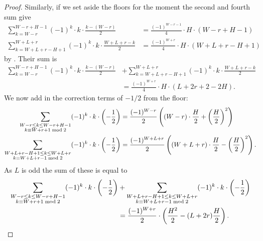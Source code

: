\begin{proof}
  Similarly, if we set aside the floors for the moment the second and fourth sum give
  \begin{align*}
    \sum_{k=W-r}^{W-r + H - 1} (-1)^{k} \cdot k \cdot \frac{k-(W-r)}{2}
    &= \frac{(-1)^{W-r-1}}{4} \cdot H \cdot \left( W - r + H - 1 \right) \\
    \sum_{k=W+L+r - H + 1}^{W+L+r} (-1)^{k} \cdot k \cdot \frac{W+L+r-k}{2}
    &= \frac{(-1)^{W+r}}{4} \cdot H \cdot \left( W + L + r - H + 1 \right)
  \end{align*}
  by .
  Their sum is
  \begin{equation}
    \begin{aligned}
      \sum_{k=W-r}^{W-r + H - 1} (-1)^{k} \cdot k \cdot \frac{k-(W-r)}{2}
      &+ \sum_{k=W+L+r-H+1}^{W+L+r} (-1)^{k} \cdot k \cdot \frac{W+L+r-k}{2} \\
      &= \frac{(-1)^{W+r}}{4} \cdot H \cdot (L + 2r + 2 - 2H).
    \end{aligned}
    \label{eq:moment24main}
  \end{equation}
  We now add in the correction terms of $-1/2$ from the floor:
  \begin{align*}
    \sum_{\substack{W-r \le k \le W-r+H-1 \\ k \equiv W+r+1 \bmod 2}} (-1)^{k} \cdot k \cdot \left( - \frac{1}{2} \right)
    &= \frac{(-1)^{W-r}}{2}
    \left( (W-r) \cdot \frac{H}{2} + \left( \frac{H}{2} \right)^2  \right) \\
    \sum_{\substack{W+L+r-H+1 \le k \le W+L+r \\ k \equiv W+L+r-1 \bmod 2}} (-1)^{k} \cdot k \cdot \left( - \frac{1}{2} \right)
    &= \frac{(-1)^{W+L+r}}{2}
    \left( (W+L+r) \cdot \frac{H}{2} - \left( \frac{H}{2} \right)^2 \right).
  \end{align*}
  As $L$ is odd the sum of these is equal to
  \begin{equation}
    \begin{aligned}
      \sum_{\substack{W-r \le k \le W-r+H-1 \\ k \equiv W+r+1 \bmod 2}} (-1)^{k} \cdot k \cdot \left( - \frac{1}{2} \right)
      &+ \sum_{\substack{W+L+r-H+1 \le k \le W+L+r \\ k \equiv W+L+r-1 \bmod 2}} (-1)^{k} \cdot k \cdot \left( - \frac{1}{2} \right) \\
      &= \frac{(-1)^{W+r}}{2} \cdot \left( \frac{H^2}{2} - (L+2r) \frac H2 \right).
    \end{aligned}
    \label{eq:moment24err}
  \end{equation}

\end{proof}
